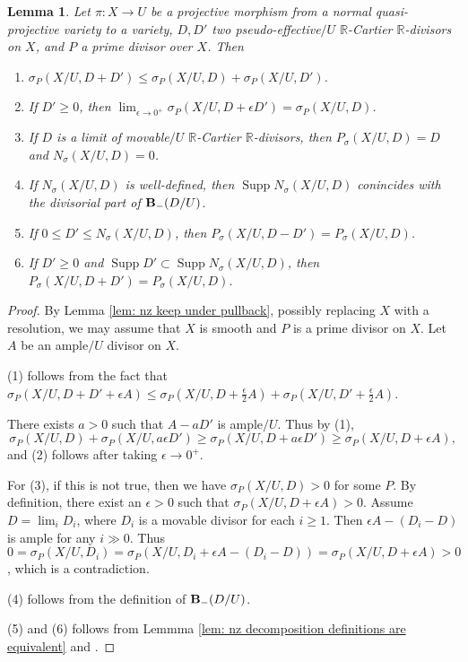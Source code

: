 \documentclass[11pt]{amsart}
\numberwithin{equation}{section}
\newcommand{\Rr}{\mathbb{R}}
\newcommand{\Supp}{\operatorname{Supp}}
\newtheorem{lem}[thm]{Lemma}
\theoremstyle{definition}
\theoremstyle{definition}
\theoremstyle{definition}
\begin{document}
\begin{lem}\label{lem: nz basic properties}
Let $\pi: X\rightarrow U$ be a projective morphism from a normal quasi-projective variety to a variety, $D,D'$ two pseudo-effective$/U$ $\Rr$-Cartier $\Rr$-divisors on $X$, and $P$ a prime divisor over $X$. Then
\begin{enumerate}
    \item $\sigma_P(X/U,D+D')\leq\sigma_P(X/U,D)+\sigma_P(X/U,D')$.
    \item If $D'\geq 0$, then $\lim_{\epsilon\rightarrow 0^+}\sigma_P(X/U,D+\epsilon D')=\sigma_P(X/U,D)$.
    \item If $D$ is a limit of movable$/U$ $\Rr$-Cartier $\Rr$-divisors, then $P_{\sigma}(X/U,D)=D$ and $N_{\sigma}(X/U,D)=0$.
    \item If $N_{\sigma}(X/U,D)$ is well-defined, then $\Supp N_{\sigma}(X/U,D)$ conincides with the divisorial part of ${\bf{B}}_{-}(D/U)$.
    \item If $0\leq D'\leq N_{\sigma}(X/U,D)$, then $P_{\sigma}(X/U,D-D')=P_{\sigma}(X/U,D)$.
    \item If $D'\geq 0$ and $\Supp D'\subset\Supp N_{\sigma}(X/U,D)$, then $P_{\sigma}(X/U,D+D')=P_{\sigma}(X/U,D)$.
\end{enumerate}
\end{lem}
\begin{proof}
By Lemma \ref{lem: nz keep under pullback}, possibly replacing $X$ with a resolution, we may assume that $X$ is smooth and $P$ is a prime divisor on $X$. Let $A$ be an ample$/U$ divisor on $X$. \par

(1) follows from the fact that $\sigma_P(X/U,D+D'+\epsilon A)\le\sigma_P(X/U,D+\frac{\epsilon}{2}A)+\sigma_P(X/U, D'+\frac{\epsilon}{2}A)$.

There exists $a>0$ such that $A-aD'$ is ample$/U$. Thus by (1), $$\sigma_P(X/U,D)+\sigma_P(X/U,a\epsilon D')\ge\sigma_P(X/U, D+a\epsilon D')\ge\sigma_P(X/U,D+\epsilon A),$$
and (2) follows after taking $\epsilon\to 0^+$.


For (3), if this is not true, then we have $\sigma_P(X/U,D)>0$ for some $P$. By definition, there exist an $\epsilon>0$ such that $\sigma_P(X/U,D+\epsilon A)>0$. Assume $D=\lim_iD_i$, where $D_i$ is a movable divisor for each $i\ge1$. Then $\epsilon A-(D_i-D)$ is ample for any $i\gg0$. Thus $0=\sigma_P(X/U,D_i)=\sigma_P(X/U,D_i+\epsilon A-(D_i-D))=\sigma_P(X/U,D+\epsilon A)>0$, which is a contradiction.


(4) follows from the definition of ${\bf{B}}_-(D/U)$.

(5) and (6) follows from Lemmma \ref{lem: nz decomposition definitions are equivalent} and \cite[III, Lemma 4.2]{Nak04}.
\end{proof}
\end{document}
